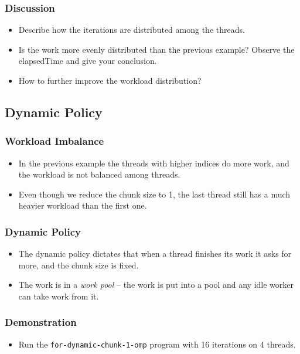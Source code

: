 \documentclass{beamer}
\begin{document}
\begin{frame}
  \frametitle{Discussion}
  \begin{itemize}
  \item Describe how the iterations are distributed among the threads.
  \item Is the work more evenly distributed than the previous example?
    Observe the elapsedTime and give your conclusion.
  \item How to further improve the workload distribution?
  \end{itemize}
\end{frame}

\subsection{Dynamic Policy}

\begin{frame}
  \frametitle{Workload Imbalance}
  \begin{itemize}
  \item In the previous example the threads with higher indices do
    more work, and the workload is not balanced among threads.
  \item Even though we reduce the chunk size to 1, the last thread still
    has a much heavier workload than the first one.
  \end{itemize}
\end{frame}

\begin{frame}
  \frametitle{Dynamic Policy}
  \begin{itemize}
  \item The dynamic policy dictates that when a thread finishes its
    work it asks for more, and the chunk size is fixed.
  \item The work is in a {\em work pool} -- the work is put into a
    pool and any idle worker can take work from it.
  \end{itemize}
\end{frame}

\begin{frame}
\end{frame}

\begin{frame}
  \frametitle{Demonstration}
  \begin{itemize}
  \item Run the {\tt for-dynamic-chunk-1-omp} program with 16 iterations
    on 4 threads.
  \end{itemize}
\end{frame}
\end{document}
